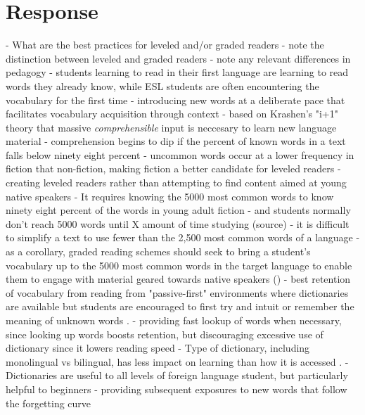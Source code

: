\documentclass[
	letterpaper, %
]{jdf}
\begin{document}
\section{Response}

- What are the best practices for leveled and/or graded readers
  - note the distinction between leveled and graded readers
    - note any relevant differences in pedagogy
      - students learning to read in their first language are learning to read words they already know, while ESL students are often encountering the vocabulary for the first time \cite{hu_2000}
  - introducing new words at a deliberate pace that facilitates vocabulary acquisition through context
    - based on Krashen's "i+1" theory that massive \textit{comprehensible} input is neccesary to learn new language material \cite{krashenreview}
    - comprehension begins to dip if the percent of known words in a text falls below ninety eight percent \cite{hu_2000}
    - uncommon words occur at a lower frequency in fiction that non-fiction, making fiction a better candidate for leveled readers \cite{hu_2000}
  - creating leveled readers rather than attempting to find content aimed at young native speakers
    - It requires knowing the 5000 most common words to know ninety eight percent of the words in young adult fiction \cite{nation1992vocabulary}
      - and students normally don't reach 5000 words until X amount of time studying (source)
    - it is difficult to simplify a text to use fewer than the 2,500 most common words of a language \cite{nation1992vocabulary}
    - as a corollary, graded reading schemes should seek to bring a student's vocabulary up to the 5000 most common words in the target language to enable them to engage with material geared towards native speakers (\cite{Nation2020GradedRA})
  - best retention of vocabulary from reading from "passive-first" environments where dictionaries are available but students are encouraged to first try and intuit or remember the meaning of unknown words \cite{mcdonald2016}.
    - providing fast lookup of words when necessary, since looking up words boosts retention, but discouraging excessive use of dictionary since it lowers reading speed \cite{dictionaryimportance}
    - Type of dictionary, including monolingual vs bilingual, has less impact on learning than how it is accessed \cite{dictionarypitfalls, imagesdictionary, bilingual_dictionary}.
    - Dictionaries are useful to all levels of foreign language student, but particularly helpful to beginners \cite{dictionaryvalue}
  - providing subsequent exposures to new words that follow the forgetting curve
\end{document}
